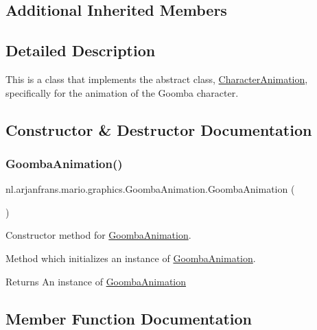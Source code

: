 \subsection*{Additional Inherited Members}


\subsection{Detailed Description}
This is a class that implements the abstract class, \hyperlink{classnl_1_1arjanfrans_1_1mario_1_1graphics_1_1CharacterAnimation}{Character\+Animation}, specifically for the animation of the Goomba character. 

\subsection{Constructor \& Destructor Documentation}
\mbox{\label{classnl_1_1arjanfrans_1_1mario_1_1graphics_1_1GoombaAnimation_a992fa17bfdfa40dea72f5f4453c821a6}} 
\subsubsection{\texorpdfstring{Goomba\+Animation()}{GoombaAnimation()}}
{\footnotesize\ttfamily nl.\+arjanfrans.\+mario.\+graphics.\+Goomba\+Animation.\+Goomba\+Animation (\begin{DoxyParamCaption}{ }\end{DoxyParamCaption})}



Constructor method for \hyperlink{classnl_1_1arjanfrans_1_1mario_1_1graphics_1_1GoombaAnimation}{Goomba\+Animation}. 

Method which initializes an instance of \hyperlink{classnl_1_1arjanfrans_1_1mario_1_1graphics_1_1GoombaAnimation}{Goomba\+Animation}. \begin{DoxyReturn}{Returns}
An instance of \hyperlink{classnl_1_1arjanfrans_1_1mario_1_1graphics_1_1GoombaAnimation}{Goomba\+Animation} 
\end{DoxyReturn}


\subsection{Member Function Documentation}
\mbox{\label{classnl_1_1arjanfrans_1_1mario_1_1graphics_1_1GoombaAnimation_a10532017e2baab74a43750e906a8bcdc}} 
